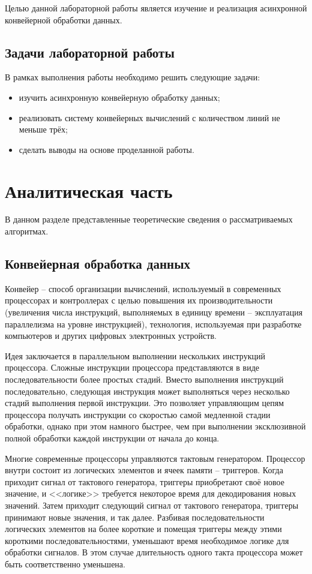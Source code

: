 \documentclass[12pt]{report}
\begin{document}
Целью данной лабораторной работы является изучение и реализация асинхронной конвейерной обработки данных.

\section*{Задачи лабораторной работы}

В рамках выполнения работы необходимо решить следующие задачи:

\begin{itemize}
	\item изучить асинхронную конвейерную обработку данных;
	\item реализовать систему конвейерных вычислений с количеством линий не меньше трёх;
	\item сделать выводы на основе проделанной работы.
\end{itemize}

\chapter{Аналитическая часть}

В данном разделе представленные теоретические сведения о рассматриваемых алгоритмах.

\section{Конвейерная обработка данных}

Конвейер -- способ организации вычислений, используемый в современных процессорах и контроллерах с целью повышения их производительности (увеличения числа инструкций, выполняемых в единицу времени -- эксплуатация параллелизма на уровне инструкцией), технология, используемая при разработке компьютеров и других цифровых электронных устройств.

Идея заключается в параллельном выполнении нескольких инструкций процессора. Сложные инструкции процессора представляются в виде последовательности более простых стадий. Вместо выполнения инструкций последовательно, следующая инструкция может выполняться через несколько стадий выполнения первой инструкции. Это позволяет управляющим цепям процессора получать инструкции со скоростью самой медленной стадии обработки, однако при этом намного быстрее, чем при выполнении эксклюзивной полной обработки каждой инструкции от начала до конца.

Многие современные процессоры управляются тактовым генератором. Процессор внутри состоит из логических элементов и ячеек памяти -- триггеров. Когда приходит сигнал от тактового генератора, триггеры приобретают своё новое значение, и <<логике>> требуется некоторое время для декодирования новых значений. Затем приходит следующий сигнал от тактового генератора, триггеры принимают новые значения, и так далее. Разбивая последовательности логических элементов на более короткие и помещая триггеры между этими короткими последовательностями, уменьшают время необходимое логике для обработки сигналов. В этом случае длительность одного такта процессора может быть соответственно уменьшена.
\end{document}
